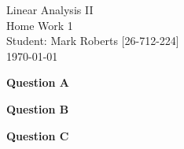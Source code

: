 \documentclass[12pt,a4paper]{article}
\newcommand{\question}[2]{\textbf{Question #1}\quad #2}
\begin{document}
\begin{titlepage}
\centering
\vspace*{\fill} %

{\Huge Linear Analysis II} \\[0.5cm] %
{\Huge Home Work 1}\\[1.5cm] %
{\Large Student: Mark Roberts [26-712-224]}\\[0.5cm] %
{\Large \today} %

\vspace*{\fill}
\end{titlepage}
\newpage

\question{A}

\newpage

\question{B}

\newpage

\question{C}
\end{document}
